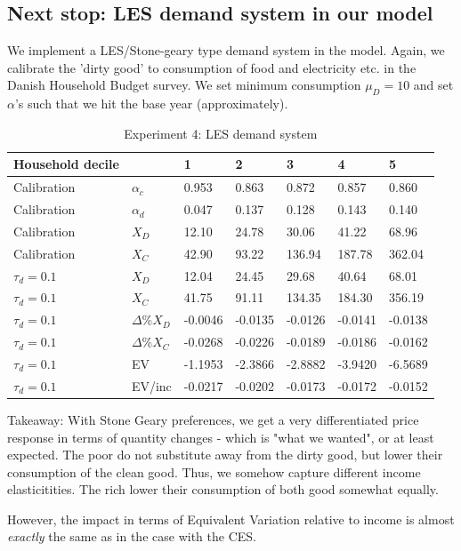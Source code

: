 \subsection{Next stop: LES demand system in our model}
We implement a LES/Stone-geary type demand system in the model. Again, we calibrate the 'dirty good' to consumption of food and electricity etc. in the Danish Household Budget survey. We set minimum consumption $\mu_D=10$ and set $\alpha$'s such that we hit the base year (approximately).
\begin{table}[H]
\centering
\caption{Experiment 4: LES demand system}
\begin{tabular}{lllllll}
Household decile               &       & 1       & 2       & 3        & 4        & 5        \\ \hline           Calibration     &$\alpha_c$ & 0.953 & 0.863 & 0.872 & 0.857 & 0.860 \\ 
Calibration     &$\alpha_d$ & 0.047 & 0.137 & 0.128 & 0.143 & 0.140 \\ 
Calibration     & $X_D$  & 12.10 & 24.78 & 30.06  & 41.22  & 68.96  \\
Calibration     & $X_C$  & 42.90 & 93.22 & 136.94 & 187.78 & 362.04 \\ \hline
$\tau_d=0.1$    & $X_D$  & 12.04 & 24.45 & 29.68  & 40.64  & 68.01  \\
$\tau_d=0.1$    & $X_C$  & 41.75 & 91.11 & 134.35 & 184.30 & 356.19 \\
$\tau_d=0.1$    & $\Delta \% X_D$ & -0.0046 & -0.0135	 & -0.0126	  & -0.0141	  & 	-0.0138  \\
$\tau_d=0.1$    & $\Delta \% X_C$ & -0.0268& -0.0226 & -0.0189	  & -0.0186	 & -0.0162 \\
$\tau_d=0.1$    & EV    & -1.1953 & -2.3866 & -2.8882  & -3.9420  & -6.5689  \\
$\tau_d=0.1$    & EV/inc & -0.0217 & -0.0202 & -0.0173  & -0.0172  & -0.0152 
\end{tabular}
\end{table}

Takeaway: With Stone Geary preferences, we get a very differentiated price response in terms of quantity changes - which is "what we wanted", or at least expected. The poor do not substitute away from the dirty good, but lower their consumption of the clean good. Thus, we somehow capture different income elasticitities. The rich lower their consumption of both good somewhat equally.

However, the impact in terms of Equivalent Variation relative to income is almost \textit{exactly} the same as in the case with the CES.